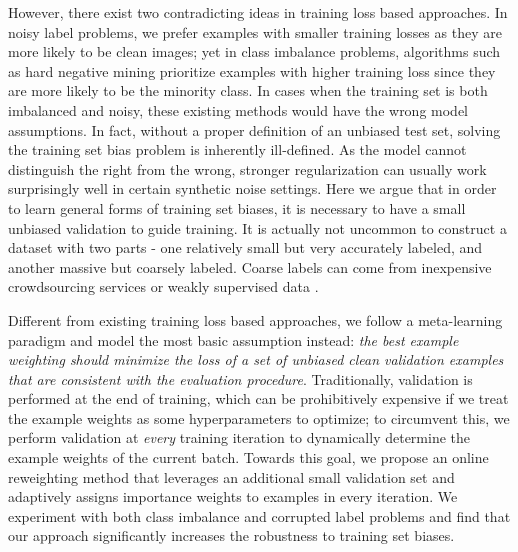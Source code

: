 However, there exist two contradicting ideas in training loss based approaches. In noisy label
problems, we prefer examples with smaller training losses as they are more likely to be clean
images; yet in class imbalance problems, algorithms such as hard negative mining \cite{hardneg}
prioritize examples with higher training loss since they are more likely to be the minority class.
In cases when the training set is both imbalanced and noisy, these existing methods would have the
wrong model assumptions. In fact, without a proper definition of an unbiased test set, solving the
training set bias problem is inherently ill-defined. As the model cannot distinguish the right from
the wrong, stronger regularization can usually work surprisingly well in certain synthetic noise
settings. Here we argue that in order to learn general forms of training set biases, it is necessary
to have a small unbiased validation to guide training. It is actually not uncommon to construct a
dataset with two parts - one relatively small but very accurately  labeled, and another massive but
coarsely labeled. Coarse labels can come from inexpensive crowdsourcing services   or weakly
supervised data \cite{cityscapes,ILSVRC15,webly}.

Different from existing training loss based approaches, we follow a meta-learning paradigm and model
the most basic assumption instead: \textit{the best example weighting should minimize the loss of a
set of unbiased clean validation examples that are consistent with the evaluation procedure}.
Traditionally, validation is performed at the end of training, which can be prohibitively expensive
if we treat the example weights as some hyperparameters to optimize; to circumvent this, we perform
validation at \textit{every} training iteration to dynamically determine the example weights of the
current batch. Towards this goal, we propose  an online reweighting method that leverages an
additional small validation set and adaptively assigns importance weights to examples in every
iteration. We experiment with both class imbalance and corrupted label problems and find that our
approach significantly increases the robustness to training set biases.
